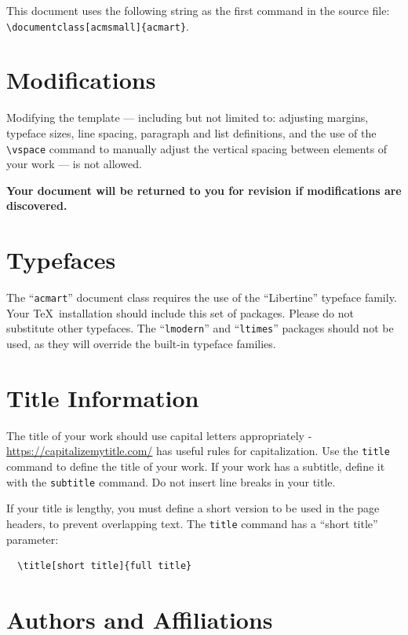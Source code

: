 \documentclass[acmsmall]{acmart}
\begin{document}
This document uses the following string as the first command in the
source file:
\verb|\documentclass[acmsmall]{acmart}|.

\section{Modifications}

Modifying the template --- including but not limited to: adjusting
margins, typeface sizes, line spacing, paragraph and list definitions,
and the use of the \verb|\vspace| command to manually adjust the
vertical spacing between elements of your work --- is not allowed.

{\bfseries Your document will be returned to you for revision if
  modifications are discovered.}

\section{Typefaces}

The ``\verb|acmart|'' document class requires the use of the
``Libertine'' typeface family. Your \TeX\ installation should include
this set of packages. Please do not substitute other typefaces. The
``\verb|lmodern|'' and ``\verb|ltimes|'' packages should not be used,
as they will override the built-in typeface families.

\section{Title Information}

The title of your work should use capital letters appropriately -
\url{https://capitalizemytitle.com/} has useful rules for
capitalization. Use the {\verb|title|} command to define the title of
your work. If your work has a subtitle, define it with the
{\verb|subtitle|} command.  Do not insert line breaks in your title.

If your title is lengthy, you must define a short version to be used
in the page headers, to prevent overlapping text. The \verb|title|
command has a ``short title'' parameter:
\begin{verbatim}
  \title[short title]{full title}
\end{verbatim}

\section{Authors and Affiliations}
\end{document}

